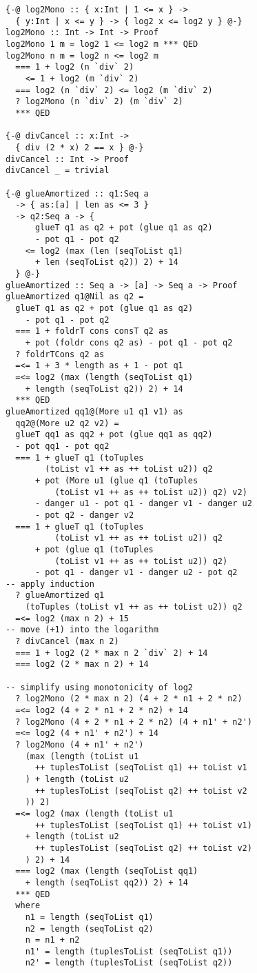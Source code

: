 \documentclass[sigplan,screen]{acmart}
\begin{document}
\begin{lstlisting}
{-@ log2Mono :: { x:Int | 1 <= x } ->
  { y:Int | x <= y } -> { log2 x <= log2 y } @-}
log2Mono :: Int -> Int -> Proof
log2Mono 1 m = log2 1 <= log2 m *** QED
log2Mono n m = log2 n <= log2 m
  === 1 + log2 (n `div` 2)
    <= 1 + log2 (m `div` 2)
  === log2 (n `div` 2) <= log2 (m `div` 2)
  ? log2Mono (n `div` 2) (m `div` 2)
  *** QED

{-@ divCancel :: x:Int ->
  { div (2 * x) 2 == x } @-}
divCancel :: Int -> Proof
divCancel _ = trivial

{-@ glueAmortized :: q1:Seq a
  -> { as:[a] | len as <= 3 }
  -> q2:Seq a -> {
      glueT q1 as q2 + pot (glue q1 as q2)
      - pot q1 - pot q2
    <= log2 (max (len (seqToList q1)
      + len (seqToList q2)) 2) + 14
  } @-}
glueAmortized :: Seq a -> [a] -> Seq a -> Proof
glueAmortized q1@Nil as q2 =
  glueT q1 as q2 + pot (glue q1 as q2)
    - pot q1 - pot q2
  === 1 + foldrT cons consT q2 as
    + pot (foldr cons q2 as) - pot q1 - pot q2
  ? foldrTCons q2 as
  =<= 1 + 3 * length as + 1 - pot q1
  =<= log2 (max (length (seqToList q1)
    + length (seqToList q2)) 2) + 14
  *** QED
glueAmortized qq1@(More u1 q1 v1) as
  qq2@(More u2 q2 v2) =
  glueT qq1 as qq2 + pot (glue qq1 as qq2)
  - pot qq1 - pot qq2
  === 1 + glueT q1 (toTuples
        (toList v1 ++ as ++ toList u2)) q2
      + pot (More u1 (glue q1 (toTuples
          (toList v1 ++ as ++ toList u2)) q2) v2)
      - danger u1 - pot q1 - danger v1 - danger u2
      - pot q2 - danger v2
  === 1 + glueT q1 (toTuples
          (toList v1 ++ as ++ toList u2)) q2
      + pot (glue q1 (toTuples
          (toList v1 ++ as ++ toList u2)) q2)
      - pot q1 - danger v1 - danger u2 - pot q2
-- apply induction
  ? glueAmortized q1
    (toTuples (toList v1 ++ as ++ toList u2)) q2
  =<= log2 (max n 2) + 15
-- move (+1) into the logarithm
  ? divCancel (max n 2)
  === 1 + log2 (2 * max n 2 `div` 2) + 14
  === log2 (2 * max n 2) + 14

-- simplify using monotonicity of log2
  ? log2Mono (2 * max n 2) (4 + 2 * n1 + 2 * n2)
  =<= log2 (4 + 2 * n1 + 2 * n2) + 14
  ? log2Mono (4 + 2 * n1 + 2 * n2) (4 + n1' + n2')
  =<= log2 (4 + n1' + n2') + 14
  ? log2Mono (4 + n1' + n2')
    (max (length (toList u1
      ++ tuplesToList (seqToList q1) ++ toList v1
    ) + length (toList u2
      ++ tuplesToList (seqToList q2) ++ toList v2
    )) 2)
  =<= log2 (max (length (toList u1
      ++ tuplesToList (seqToList q1) ++ toList v1)
    + length (toList u2
      ++ tuplesToList (seqToList q2) ++ toList v2)
    ) 2) + 14
  === log2 (max (length (seqToList qq1)
    + length (seqToList qq2)) 2) + 14
  *** QED
  where
    n1 = length (seqToList q1)
    n2 = length (seqToList q2)
    n = n1 + n2
    n1' = length (tuplesToList (seqToList q1))
    n2' = length (tuplesToList (seqToList q2))
\end{lstlisting}
\end{document}
